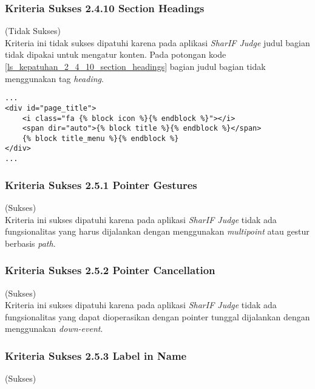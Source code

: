 \subsubsection{Kriteria Sukses 2.4.10 Section Headings}
\label{subsubsec:kepatuhan_kriteria_2.4.10}
(Tidak Sukses) \\

Kriteria ini tidak sukses dipatuhi karena pada aplikasi \textit{SharIF Judge} judul bagian tidak dipakai untuk mengatur konten. Pada potongan kode \ref{ls_kepatuhan_2_4_10_section_headings} bagian judul bagian tidak menggunakan tag \textit{heading}.
\begin{lstlisting}[basicstyle=\ttfamily, frame=single,
columns=fullflexible, keepspaces=true, breaklines=true, label=ls_kepatuhan_2_4_10_section_headings, caption=Kriteria Sukses 2.4.10 - Title Heading]
...
<div id="page_title">
	<i class="fa {% block icon %}{% endblock %}"></i>
	<span dir="auto">{% block title %}{% endblock %}</span>
	{% block title_menu %}{% endblock %}
</div>
...
\end{lstlisting}

\subsubsection{Kriteria Sukses 2.5.1 Pointer Gestures}
\label{subsubsec:kepatuhan_kriteria_2.5.1}
(Sukses) \\

Kriteria ini sukses dipatuhi karena pada aplikasi \textit{SharIF Judge} tidak ada fungsionalitas yang harus dijalankan dengan menggunakan \textit{multipoint} atau gestur berbasis \textit{path}.

\subsubsection{Kriteria Sukses 2.5.2 Pointer Cancellation}
\label{subsubsec:kepatuhan_kriteria_2.5.2}
(Sukses) \\

Kriteria ini sukses dipatuhi karena pada aplikasi \textit{SharIF Judge} tidak ada fungsionalitas yang dapat dioperasikan dengan pointer tunggal dijalankan dengan menggunakan \textit{down-event}.

\subsubsection{Kriteria Sukses 2.5.3 Label in Name}
\label{subsubsec:kepatuhan_kriteria_2.5.3}
(Sukses) \\

